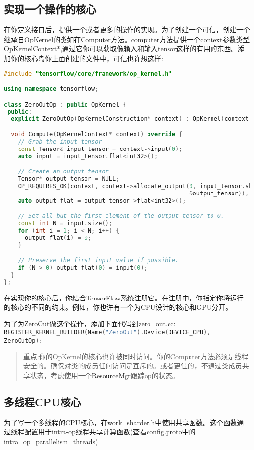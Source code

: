 \subsection{实现一个操作的核心}
在你定义接口后，提供一个或者更多的操作的实现。为了创建一个可信，创建一个继承自OpKernel的类如在Computer方法。computer方法提供一个context参数类型OpKernelContext*,通过它你可以获取像输入和输入tensor这样的有用的东西。添加你的核心岛你上面创建的文件中，可信也许想这样:
\begin{lstlisting}[language=C++]
#include "tensorflow/core/framework/op_kernel.h"

using namespace tensorflow;

class ZeroOutOp : public OpKernel {
 public:
  explicit ZeroOutOp(OpKernelConstruction* context) : OpKernel(context) {}

  void Compute(OpKernelContext* context) override {
    // Grab the input tensor
    const Tensor& input_tensor = context->input(0);
    auto input = input_tensor.flat<int32>();

    // Create an output tensor
    Tensor* output_tensor = NULL;
    OP_REQUIRES_OK(context, context->allocate_output(0, input_tensor.shape(),
                                                     &output_tensor));
    auto output_flat = output_tensor->flat<int32>();

    // Set all but the first element of the output tensor to 0.
    const int N = input.size();
    for (int i = 1; i < N; i++) {
      output_flat(i) = 0;
    }

    // Preserve the first input value if possible.
    if (N > 0) output_flat(0) = input(0);
  }
};

\end{lstlisting}
在实现你的核心后，你结合TensorFlow系统注册它。在注册中，你指定你将运行的核心的不同的约束。例如，你也许有一个为CPU设计的核心和GPU分开。

为了为ZeroOut做这个操作，添加下面代码到zero\_out.cc:
\lstinline[language=C++]{REGISTER_KERNEL_BUILDER(Name("ZeroOut").Device(DEVICE_CPU), ZeroOutOp);}
\begin{quote}
重点:你的OpKernel的核心也许被同时访问。你的Computer方法必须是线程安全的。确保对类的成员任何访问是互斥的。或者更佳的，不通过类成员共享状态，考虑使用一个\href{https://www.github.com/tensorflow/tensorflow/blob/r1.4/tensorflow/core/framework/resource_mgr.h}{ResourceMgr}跟踪op的状态。
\end{quote}
\subsection{多线程CPU核心}
为了写一个多线程的CPU核心，在\href{https://www.github.com/tensorflow/tensorflow/blob/r1.4/tensorflow/core/util/work_sharder.h}{work\_sharder.h}中使用共享函数。这个函数通过线程配置用于intra-op线程共享计算函数(查看\href{https://www.github.com/tensorflow/tensorflow/blob/r1.4/tensorflow/core/protobuf/config.proto}{config.proto}中的intra\_op\_parallelism\_threads)

